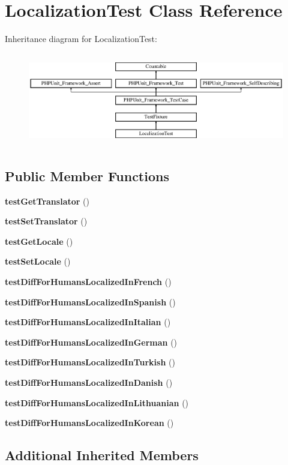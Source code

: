 \section{Localization\+Test Class Reference}
\label{class_localization_test}
Inheritance diagram for Localization\+Test\+:\begin{figure}[H]
\begin{center}
\leavevmode
\includegraphics[height=4.129793cm]{class_localization_test}
\end{center}
\end{figure}
\subsection*{Public Member Functions}
\begin{DoxyCompactItemize}
\item 
{\bf test\+Get\+Translator} ()
\item 
{\bf test\+Set\+Translator} ()
\item 
{\bf test\+Get\+Locale} ()
\item 
{\bf test\+Set\+Locale} ()
\item 
{\bf test\+Diff\+For\+Humans\+Localized\+In\+French} ()
\item 
{\bf test\+Diff\+For\+Humans\+Localized\+In\+Spanish} ()
\item 
{\bf test\+Diff\+For\+Humans\+Localized\+In\+Italian} ()
\item 
{\bf test\+Diff\+For\+Humans\+Localized\+In\+German} ()
\item 
{\bf test\+Diff\+For\+Humans\+Localized\+In\+Turkish} ()
\item 
{\bf test\+Diff\+For\+Humans\+Localized\+In\+Danish} ()
\item 
{\bf test\+Diff\+For\+Humans\+Localized\+In\+Lithuanian} ()
\item 
{\bf test\+Diff\+For\+Humans\+Localized\+In\+Korean} ()
\end{DoxyCompactItemize}
\subsection*{Additional Inherited Members}


